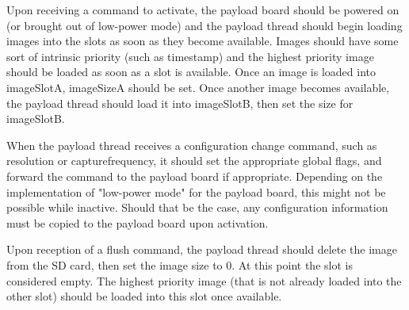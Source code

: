\documentclass{article}
\begin{document}
Upon receiving a command to activate, the payload board should be powered on (or
brought out of low-power mode) and the payload thread should begin loading 
images into the slots as soon as they become available. Images should have some
sort of intrinsic priority (such as timestamp) and the highest priority image
should be loaded as soon as a slot is available. Once an image is loaded into
imageSlotA, imageSizeA should be set. Once another image becomes available, 
the payload thread should load it into imageSlotB, then set the size for
imageSlotB.

When the payload thread receives a configuration change command, such as resolution
or capturefrequency, it should set the appropriate global flags, and forward
the command to the payload board if appropriate. Depending on the implementation
of "low-power mode" for the payload board, this might not be possible while
inactive. Should that be the case, any configuration information must be copied to
the payload board upon activation.

Upon reception of a flush command, the payload thread should delete the image
from the SD card, then set the image size to 0. At this point the slot is
considered empty. The highest priority image (that is not already loaded into
the other slot) should be loaded into this slot
once available.
\end{document}
